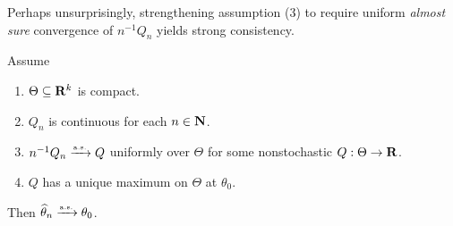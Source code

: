 \documentclass[11pt,letterpaper,reqno,oneside]{article}
\begin{document}
Perhaps unsurprisingly, strengthening assumption (3) to require uniform \emph{almost sure} convergence of $n^{-1} Q_n$ yields strong consistency.
%
\begin{proposition}
	\label{proposition:strong_consistency}
	Assume
	\begin{enumerate}

		\item $\Theta \subseteq \mathbf{R}^k$ is compact.

		\item $Q_n$ is continuous for each $n \in \mathbf{N}$.

		\item $n^{-1} Q_n \xrightarrow{{\scriptscriptstyle \mathrm{a.s.}}} Q$ uniformly over $\Theta$ for some nonstochastic $Q : \Theta \to \mathbf{R}$.

		\item $Q$ has a unique maximum on $\Theta$ at $\theta_0$.

	\end{enumerate}
	Then $\widehat{\theta}_n \xrightarrow{{\scriptscriptstyle \mathrm{a.s.}}} \theta_0$.
\end{proposition}
\end{document}
